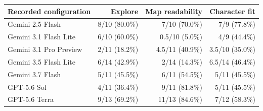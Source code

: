 \begin{tabularx}{\textwidth}{@{}Yrrr@{}}
\toprule
Recorded configuration & Explore & Map readability & Character fit \\
\midrule
Gemini 2.5 Flash & 8/10 (80.0\%) & 7/10 (70.0\%) & 7/9 (77.8\%) \\
Gemini 3.1 Flash Lite & 6/10 (60.0\%) & 0.5/10 (5.0\%) & 4/9 (44.4\%) \\
Gemini 3.1 Pro Preview & 2/11 (18.2\%) & 4.5/11 (40.9\%) & 3.5/10 (35.0\%) \\
Gemini 3.5 Flash Lite & 6/14 (42.9\%) & 2/14 (14.3\%) & 6.5/14 (46.4\%) \\
Gemini 3.7 Flash & 5/11 (45.5\%) & 6/11 (54.5\%) & 5/11 (45.5\%) \\
GPT-5.6 Sol & 4/11 (36.4\%) & 9/11 (81.8\%) & 5/11 (45.5\%) \\
GPT-5.6 Terra & 9/13 (69.2\%) & 11/13 (84.6\%) & 7/12 (58.3\%) \\
\bottomrule
\end{tabularx}
